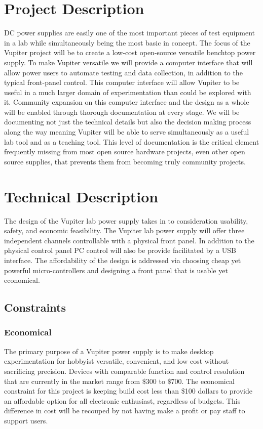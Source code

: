 \documentclass[12pt]{article}
\begin{document}
\section{Project Description}
DC power supplies are easily one of the most important pieces of test equipment 
in a lab while simultaneously being the most basic in concept. The focus of the 
Vupiter project will be to create a low-cost open-source versatile benchtop power 
supply. To make Vupiter versatile we will provide a computer interface that will 
allow power users to automate testing and data collection, in addition to the 
typical front-panel control. This computer interface will allow Vupiter to be 
useful in a much larger domain of experimentation than could be explored with it. 
Community expansion on this computer interface and the design as a whole will be 
enabled through thorough documentation at every stage. We will be documenting not 
just the technical details but also the decision making process along the way meaning 
Vupiter will be able to serve simultaneously as a useful lab tool and as a teaching 
tool. This level of documentation is the critical element frequently missing from most 
open source hardware projects, even other open source supplies, that prevents them 
from becoming truly community projects.
\section{Technical Description}
The design of the Vupiter lab power supply takes in to consideration usability, 
safety, and economic feasibility.  The Vupiter lab power supply will offer 
three independent channels controllable with a physical front panel. In addition 
to the physical control panel PC control will also be provide facilitated by a 
USB interface. The affordability of the design is addressed via choosing cheap 
yet powerful micro-controllers and designing a front panel that is usable yet 
economical.


\subsection{Constraints}
\subsubsection{Economical}
The primary purpose of a Vupiter power supply is to make desktop experimentation for 
hobbyist versatile, convenient, and low cost without sacrificing precision. Devices 
with comparable function and control resolution that are currently in the market 
range from \$300 to \$700. The economical constraint for this project is keeping 
build cost less than \$100 dollars to provide an affordable option for all electronic 
enthusiast, regardless of budgets. This difference in cost will be recouped by not having 
make a profit or pay staff to support users.
\end{document}
